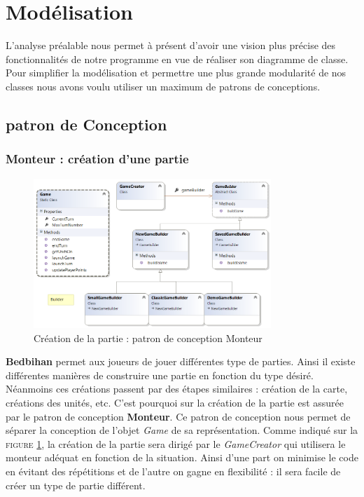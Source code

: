 \section{Modélisation}

	L'analyse préalable nous permet à présent d'avoir une vision plus précise des fonctionnalités de notre programme en vue de réaliser son diagramme de classe. Pour simplifier la modélisation et permettre une plus grande modularité de nos classes nous avons voulu utiliser un maximum de patrons de conceptions. 

	\subsection{patron de Conception}

		\subsubsection{Monteur : création d'une partie}

				\begin{figure}[h]
		\begin{center}
			\includegraphics[width=0.8\textwidth]{figure/builder.png}
		\end{center}
		\caption{Création de la partie : patron de conception Monteur}
		\label{fig:builder}
	\end{figure}

		\textbf{Bedbihan} permet aux joueurs de jouer différentes type de parties. Ainsi il existe différentes manières de construire une partie en fonction du type désiré. Néanmoins ces créations passent par des étapes similaires : création de la carte, créations des unités, etc. C'est pourquoi sur  la création de la partie est assurée par le patron de conception \textbf{Monteur}. Ce patron de conception nous permet de séparer la conception de l'objet \emph{Game} de sa représentation. Comme indiqué sur la \textsc{figure} \ref{fig:builder}, la création de la partie sera dirigé par le \emph{GameCreator} qui utilisera le monteur adéquat en fonction de la situation. Ainsi d'une part on minimise le code en évitant des répétitions et de l'autre on gagne en flexibilité : il sera facile de créer un type de partie différent. 




